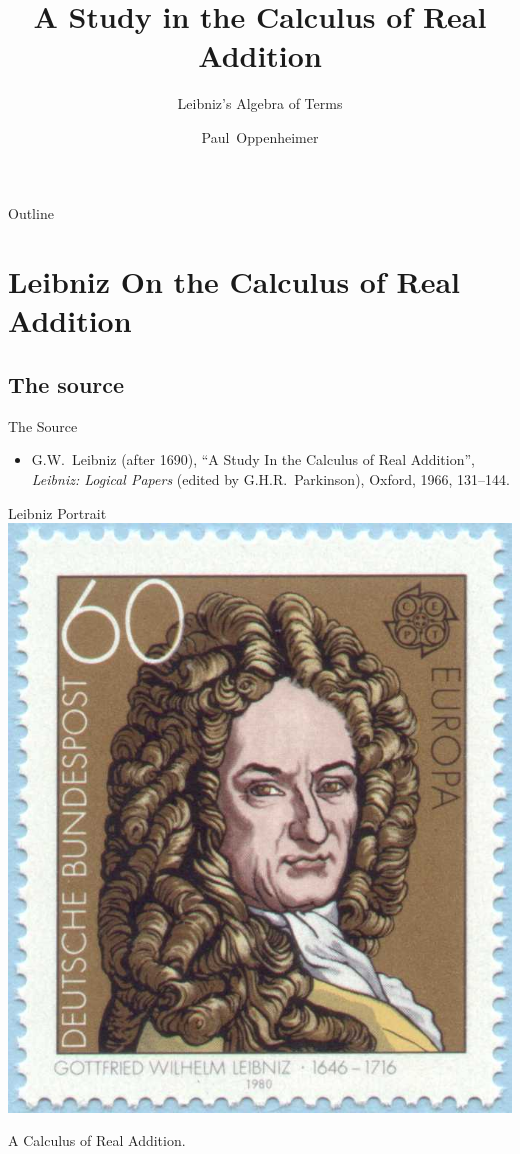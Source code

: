 \documentclass[pdf]{beamer}
\title{A Study in the Calculus of Real Addition}
\subtitle{Leibniz's Algebra of Terms}
\author{Paul~Oppenheimer}
\begin{document}
\begin{frame}
  \titlepage
\end{frame}
\begin{frame}{Outline}
  \tableofcontents[pausesections]
\end{frame}
\section{Leibniz On the Calculus of Real Addition}
\subsection{The source}
\begin{frame}{The Source}{}
  \begin{itemize}
  \item G.W.~Leibniz (after 1690), ``A Study In the Calculus of Real Addition'',  {\em Leibniz: Logical Papers} (edited by G.H.R.~Parkinson), Oxford, 1966, 131--144.
  \end{itemize}
\end{frame}
\begin{frame}{Leibniz Portrait}
\includegraphics{leibniz2}
\end{frame}
\begin{frame}{A Calculus of Real Addition.}
\end{frame}
\end{document}
